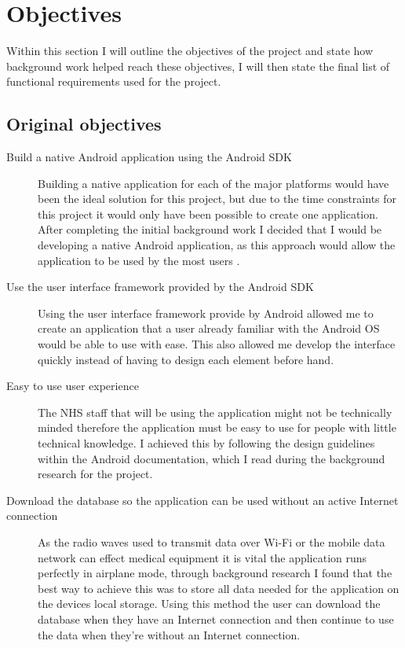 \section{Objectives}

Within this section I will outline the objectives of the project and state how background work helped reach these objectives, I will then state the final list of functional requirements used for the project.

\subsection{Original objectives}

\begin{description}
	\item[Build a native Android application using the Android SDK]  Building a native application for each of the major platforms would have been the ideal solution for this project, but due to the time constraints for this project it would only have been possible to create one application. After completing the initial background work I decided that I would be developing a native Android \cite{android} application, as this approach would allow the application to be used by the most users \cite{phone_market}.
	\item[Use the user interface framework provided by the Android SDK] Using the user interface framework provide by Android allowed me to create an application that a user already familiar with the Android OS would be able to use with ease. This also allowed me develop the interface quickly instead of having to design each element before hand.
	\item[Easy to use user experience]  The NHS staff that will be using the application might not be technically minded therefore the application must be easy to use for people with little technical knowledge. I achieved this by following the design guidelines within the Android documentation, which I read during the background research for the project.
	\item[Download the database so the application can be used without an active Internet connection] As the radio waves used to transmit data over Wi-Fi or the mobile data network can effect medical equipment \cite{mobile_inter} it is vital the application runs perfectly in airplane mode, through background research I found that the best way to achieve this was to store all data needed for the application on the devices local storage. Using this method the user can download the database when they have an Internet connection and then continue to use the data when they’re without an Internet connection.

\end{description}
